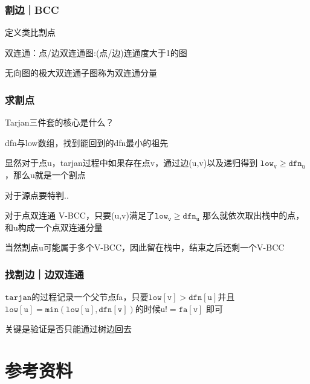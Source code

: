 \documentclass{beamer}
\begin{document}
  \begin{frame}
    \frametitle{割边｜BCC}

    定义类比割点

    \vspace*{1\baselineskip}
    
    双连通：点/边双连通图:(点/边)连通度大于1的图
    
    \vspace*{1\baselineskip}
    
    无向图的极大双连通子图称为双连通分量
  \end{frame}

  \begin{frame}
    \frametitle{求割点}
    Tarjan三件套的核心是什么？
    
    dfn与low数组，找到能回到的dfn最小的祖先

    \vspace*{1\baselineskip}

    \pause
    
    显然对于点u，tarjan过程中如果存在点v，通过边(u,v)以及递归得到
    $\mathtt{low_v\geq dfn_u}$，那么u就是一个割点

    \vspace*{1\baselineskip}
    
    \pause
    对于源点要特判..
    
    \pause
    \vspace*{1\baselineskip}

    对于点双连通 V-BCC，只要(u,v)满足了$\mathtt{low_v\geq dfn_u}$
    那么就依次取出栈中的点，和u构成一个点双连通分量

    \vspace*{1\baselineskip}

    当然割点u可能属于多个V-BCC，因此留在栈中，结束之后还剩一个V-BCC
  \end{frame}

  \begin{frame}
    \frametitle{找割边｜边双连通}
    $\mathtt{tarjan}$的过程记录一个父节点fa，只要$\mathtt{low[v]>dfn[u]}$并且
    $\mathtt{low[u]=min(low[u],dfn[v])}$的时候$\mathtt{u!=fa[v]}$
    即可

    \vspace*{1\baselineskip}

    关键是验证是否只能通过树边回去
  \end{frame}

  \section{参考资料}
\end{document}
